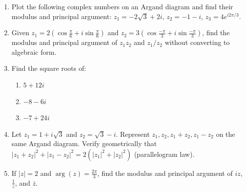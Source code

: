 \documentclass[11pt]{article}
\begin{document}
\begin{exercice}
\begin{enumerate}
    \item Plot the following complex numbers on an Argand diagram and find their modulus and principal argument:
    $z_1 = -2\sqrt{3} + 2i$, \quad $z_2 = -1 - i$, \quad $z_3 = 4e^{i2\pi/3}$.
    \item Given $z_1 = 2(\cos\frac{\pi}{6} + i\sin\frac{\pi}{6})$ and $z_2 = 3(\cos\frac{-\pi}{3} + i\sin\frac{-\pi}{3})$, find the modulus and principal argument of $z_1z_2$ and $z_1/z_2$ without converting to algebraic form.
    \item Find the square roots of:
    \begin{enumerate}
        \item $5 + 12i$
        \item $-8 - 6i$
        \item $-7 + 24i$
    \end{enumerate}
    \item Let $z_1 = 1 + i\sqrt{3}$ and $z_2 = \sqrt{3} - i$. Represent $z_1, z_2, z_1+z_2, z_1-z_2$ on the same Argand diagram. Verify geometrically that $|z_1+z_2|^2 + |z_1-z_2|^2 = 2(|z_1|^2+|z_2|^2)$ (parallelogram law).
    \item If $|z| = 2$ and $\arg(z) = \frac{2\pi}{3}$, find the modulus and principal argument of $iz$, $\frac{1}{z}$, and $\bar{z}$.
\end{enumerate}
\end{exercice}
\end{document}
